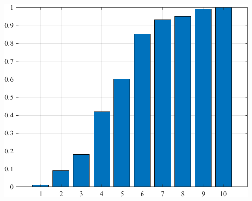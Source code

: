 \documentclass[a4paper]{scrartcl}
\begin{document}
\begin{center}
	\includegraphics*[scale = 0.5]{question4d.png}
\end{center}
\end{document}
